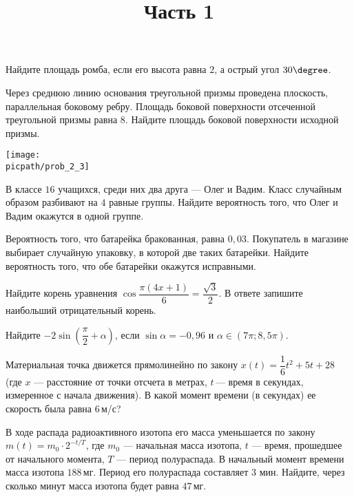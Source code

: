 \begin{training}[2]
	\title{Часть 1}
	\egepreambone
	\begin{listofex}
		\item
		Найдите площадь ромба, если его высота равна \( 2 \), а острый угол \( 30\degree \).
		\foranswer
		\item
		\begin{minipage}[t]{\bodywidth}
			Через среднюю линию основания треугольной призмы проведена плоскость, параллельная боковому ребру. Площадь боковой поверхности отсеченной треугольной призмы равна \( 8 \). Найдите площадь боковой поверхности исходной призмы.
			\foranswer
		\end{minipage}
		\gapwidth
		\begin{minipage}[t]{\picwidth}
			\texttt{[image: \\picpath/prob\_2\_3]}
		\end{minipage}
		\item В классе \( 16 \) учащихся, среди них два друга --- Олег и Вадим. Класс случайным образом разбивают на \( 4 \) равные группы. Найдите вероятность того, что Олег и Вадим окажутся в одной группе.
		\foranswer
		\item Вероятность того, что батарейка бракованная, равна \( 0,03 \). Покупатель в магазине выбирает случайную упаковку, в которой две таких батарейки. Найдите вероятность того, что обе батарейки окажутся исправными.
		\foranswer
		\item Найдите корень уравнения \( \cos\dfrac{\pi(4x+1)}{6}=\dfrac{\sqrt{3}}{2} \). В ответе запишите наибольший отрицательный корень.
		\foranswer
		\newpage
		\hphantom{Часть 1}
		\item Найдите \( -2\sin\left( \dfrac{\pi}{2}+\alpha \right) \), если \( \sin\alpha=-0,96 \) и \( \alpha\in(7\pi;8,5\pi) \).
		\foranswer
		\item 
		Материальная точка движется прямолинейно по закону \( x(t)=\dfrac{1}{6}t^2+5t+28 \) (где \( x \)  --- расстояние от точки отсчета в метрах, \( t \) --- время в секундах, измеренное с начала движения). В какой момент времени (в секундах) ее скорость была равна \( 6 \) м/с?
		\foranswer
		\item В ходе распада радиоактивного изотопа его масса уменьшается по закону \( m(t)=m_0\cdot2^{-t/T} \), где \( m_0 \) --- начальная масса изотопа, \( t \) --- время, прошедшее от начального момента, \( T \) --- период полураспада. В начальный момент времени масса изотопа \( 188 \) мг. Период его полураспада составляет \( 3 \) мин. Найдите, через сколько минут масса изотопа будет равна \( 47 \) мг.

\end{listofex}
\end{training}
